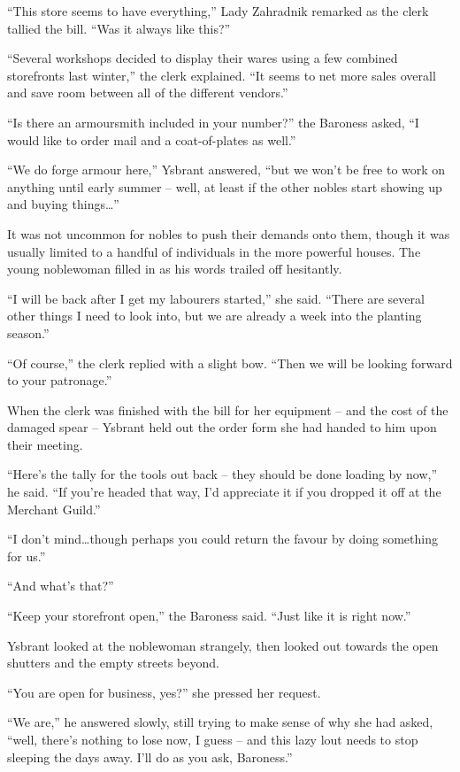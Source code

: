  

“This store seems to have everything,” Lady Zahradnik remarked as the clerk tallied the bill. “Was it always like this?”

 

“Several workshops decided to display their wares using a few combined storefronts last winter,” the clerk explained. “It seems to net more sales overall and save room between all of the different vendors.”

 

“Is there an armoursmith included in your number?” the Baroness asked, “I would like to order mail and a coat-of-plates as well.”

 

“We do forge armour here,” Ysbrant answered, “but we won’t be free to work on anything until early summer – well, at least if the other nobles start showing up and buying things…”

 

It was not uncommon for nobles to push their demands onto them, though it was usually limited to a handful of individuals in the more powerful houses. The young noblewoman filled in as his words trailed off hesitantly.

 

“I will be back after I get my labourers started,” she said. “There are several other things I need to look into, but we are already a week into the planting season.”

 

“Of course,” the clerk replied with a slight bow. “Then we will be looking forward to your patronage.”

 

When the clerk was finished with the bill for her equipment – and the cost of the damaged spear – Ysbrant held out the order form she had handed to him upon their meeting.

 

“Here’s the tally for the tools out back – they should be done loading by now,” he said. “If you’re headed that way, I’d appreciate it if you dropped it off at the Merchant Guild.”

 

“I don’t mind…though perhaps you could return the favour by doing something for us.”

 

“And what’s that?”

 

“Keep your storefront open,” the Baroness said. “Just like it is right now.”

 

Ysbrant looked at the noblewoman strangely, then looked out towards the open shutters and the empty streets beyond.

 

“You are open for business, yes?” she pressed her request.

 

“We are,” he answered slowly, still trying to make sense of why she had asked, “well, there’s nothing to lose now, I guess – and this lazy lout needs to stop sleeping the days away. I’ll do as you ask, Baroness.”
